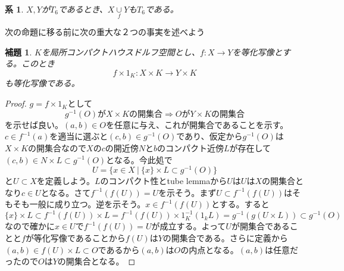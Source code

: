 \documentclass[leqno]{jsarticle}
\newtheorem{cor}[thm]{系}
\newtheorem{lem}[thm]{補題}
\newcommand{\To}{\Longrightarrow}
\begin{document}
\begin{cor}
$X,Y$が$T_6$であるとき、$X\underset{f}{\cup} Y$も$T_6$である。
\end{cor}
次の命題に移る前に次の重大な２つの事実を述べよう
\begin{lem}
$K$を局所コンパクトハウスドルフ空間とし、$f:X\to Y$を等化写像とする。このとき
\[
f\times 1_K:X\times K\to Y\times K
\]
も等化写像である。
\end{lem}
\begin{proof}
$g=f\times 1_K$として
\[
\mbox{$g^{-1}(O)$が$X\times K$の開集合}\To \mbox{$O$が$Y\times K$の開集合}
\]
を示せば良い。$(a,b)\in O$を任意に与え、これが開集合であることを示す。$c\in f^{-1}(a)$を適当に選ぶと$(c,b)\in g^{-1}(O)$であり、仮定から$g^{-1}(O)$は$X\times K$の開集合なので$X$の$c$の開近傍$N$と$b$のコンパクト近傍$L$が存在して$(c,b)\in N\times L\subset g^{-1}(O)$となる。今此処で
\[
U=\{x\in X\ |\ \{x\}\times L\subset g^{-1}(O)\}
\]
と$U\subset X$を定義しよう。$L$のコンパクト性とtube lemmaから$U$は$U$は$X$の開集合となり$c\in U$となる。さて$f^{-1}(f(U))=U$を示そう。まず$U\subset f^{-1}(f(U))$はそもそも一般に成り立つ。逆を示そう。$x\in f^{-1}(f(U))$とする。すると
\[
\{x\}\times L\subset f^{-1}(f(U))\times L=f^{-1}(f(U))\times 1^{-1}_K(1_kL)=g^{-1}(g(U\times L))\subset g^{-1}(O)
\]
なので確かに$x\in U$で$f^{-1}(f(U))=U$が成立する。よって$U$が開集合であることと$f$が等化写像であることから$f(U)$は$Y$の開集合である。さらに定義から$(a,b)\in f(U)\times L\subset O$であるから$(a,b)$は$O$の内点となる。$(a,b)$は任意だったので$O$は$Y$の開集合となる。
\end{proof}
\end{document}
